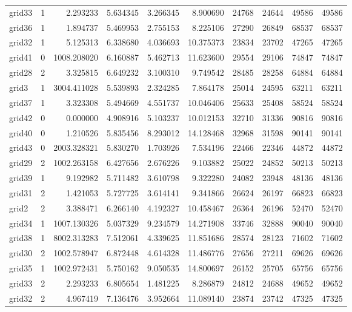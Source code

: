 \begin{longtable}{|l|r|r|r|r|r|r|r|r|r|}
grid33 & 1 & 2.293233 & 5.634345 & 3.266345 & 8.900690 & 24768 & 24644 & 49586 & 49586 \\
grid36 & 1 & 1.894737 & 5.469953 & 2.755153 & 8.225106 & 27290 & 26849 & 68537 & 68537 \\
grid32 & 1 & 5.125313 & 6.338680 & 4.036693 & 10.375373 & 23834 & 23702 & 47265 & 47265 \\
grid41 & 0 & 1008.208020 & 6.160887 & 5.462713 & 11.623600 & 29554 & 29106 & 74847 & 74847 \\
grid28 & 2 & 3.325815 & 6.649232 & 3.100310 & 9.749542 & 28485 & 28258 & 64884 & 64884 \\
grid3 & 1 & 3004.411028 & 5.539893 & 2.324285 & 7.864178 & 25014 & 24595 & 63211 & 63211 \\
grid37 & 1 & 3.323308 & 5.494669 & 4.551737 & 10.046406 & 25633 & 25408 & 58524 & 58524 \\
grid42 & 0 & 0.000000 & 4.908916 & 5.103237 & 10.012153 & 32710 & 31336 & 90816 & 90816 \\
grid40 & 0 & 1.210526 & 5.835456 & 8.293012 & 14.128468 & 32968 & 31598 & 90141 & 90141 \\
grid43 & 0 & 2003.328321 & 5.830270 & 1.703926 & 7.534196 & 22466 & 22346 & 44872 & 44872 \\
grid29 & 2 & 1002.263158 & 6.427656 & 2.676226 & 9.103882 & 25022 & 24852 & 50213 & 50213 \\
grid39 & 1 & 9.192982 & 5.711482 & 3.610798 & 9.322280 & 24082 & 23948 & 48136 & 48136 \\
grid31 & 2 & 1.421053 & 5.727725 & 3.614141 & 9.341866 & 26624 & 26197 & 66823 & 66823 \\
grid2 & 2 & 3.388471 & 6.266140 & 4.192327 & 10.458467 & 26364 & 26196 & 52470 & 52470 \\
grid34 & 1 & 1007.130326 & 5.037329 & 9.234579 & 14.271908 & 33746 & 32888 & 90040 & 90040 \\
grid38 & 1 & 8002.313283 & 7.512061 & 4.339625 & 11.851686 & 28574 & 28123 & 71602 & 71602 \\
grid30 & 2 & 1002.578947 & 6.872448 & 4.614328 & 11.486776 & 27656 & 27211 & 69626 & 69626 \\
grid35 & 1 & 1002.972431 & 5.750162 & 9.050535 & 14.800697 & 26152 & 25705 & 65756 & 65756 \\
grid33 & 2 & 2.293233 & 6.805654 & 1.481225 & 8.286879 & 24812 & 24688 & 49652 & 49652 \\
grid32 & 2 & 4.967419 & 7.136476 & 3.952664 & 11.089140 & 23874 & 23742 & 47325 & 47325 \\

\end{longtable}
